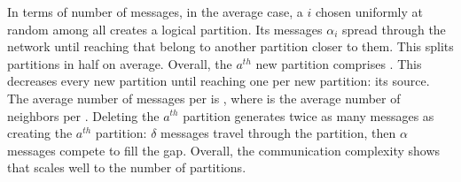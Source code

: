 In terms of number of messages, in the average case, a \process $i$
chosen uniformly at random among all \processes creates a logical
partition. Its messages $\alpha_i$ spread through the network until
reaching \processes that belong to another partition closer to
them. This splits partitions in half on average. Overall, the $a^{th}$
new partition comprises  \processes. This decreases every new
partition until reaching one \process per new partition: its
source. The average number of messages per \process is
, where  is the average
number of neighbors per \process.
Deleting the $a^{th}$ partition generates twice as many messages as
creating the $a^{th}$ partition: $\delta$ messages travel through the
partition, then $\alpha$ messages compete to fill the gap.  Overall,
the communication complexity shows that \NAME scales well to the
number of partitions.



